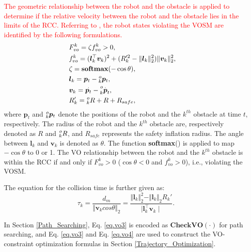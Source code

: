 \documentclass[preprint,5p,times,twocolumn,authoryear]{elsarticle}
\begin{document}

\textcolor{red}{The geometric relationship between the robot and the obstacle is applied to determine if the relative velocity between the robot and the obstacle lies in the limits of the RCC. Referring to \citep{poonganam2020reactive} , the robot states violating the VOSM are identified by the following formulations.}
\begin{equation}
\label{eq.vo3}
\begin{aligned}
    & F^k_{vo} = \zeta f^k_{vo} > 0, & \\
    & f^k_{vo} = (\bm{l}_k^\top \bm{v}_k)^2 + (R_k'^2 - \Vert \bm{l}_k \Vert_2^2) \Vert \bm{v}_k \Vert_2^2   , & \\
    & \zeta = \textbf{softmax}(-\cos{\theta}), & \\
    & \bm{l}_k = \bm{p}_t - \prescript{o}{k}{\bm{p}}_t, & \\
    & \bm{v}_k = \overset{.}{\bm{p}_t}  - \prescript{o}{k}{\overset{.}{\bm{p}}_t}, & \\
    & R_k' = \prescript{o}{k}{R} + R + R_{safe}, &
\end{aligned}
\end{equation}
where $\bm{p}_t$ and $\prescript{o}{k}{\bm{p}}_t$ denote the positions of the robot and the $k^{th}$ obstacle at time $t$, respectively. The radius of the robot and the $k^{th}$ obstacle are, respectively denoted as $R$ and $\prescript{o}{k}{R}$, and $R_{safe}$ represents the safety inflation radius. The angle between $\bm{l}_k$ and $\bm{v}_k$ is denoted as $\theta$. The function \textbf{softmax}() is applied to map $-\cos\theta$ to 0 or 1. The VO relationship between the robot and the $k^{th}$ obstacle is within the RCC if and only if $F^k_{vo}>0$ ($\cos{\theta} < 0$ and $f^k_{vo}>0$), i.e., violating the VOSM.

The equation for the collision time is further given as:
\begin{equation}
\label{eq.vo4}
\tau_k = \frac{d_m}{\Vert \bm{v}_k cos\theta \Vert_2} = \frac{ \Vert \bm{l}_k \Vert_2^2 - \Vert \bm{l}_k \Vert_2 R_k'}{\mid \bm{l}_k^\top \bm{v}_k \mid}.
\end{equation}

In Section \ref{Path_Searching}, Eq. \ref{eq.vo3} is encoded as $\textbf{CheckVO}(\cdot)$ for path searching, and Eq. \ref{eq.vo3} and Eq. \ref{eq.vo4} are used to construct the VO-constraint optimization formulas in Section \ref{Trajectory_Optimization}.
\end{document}
